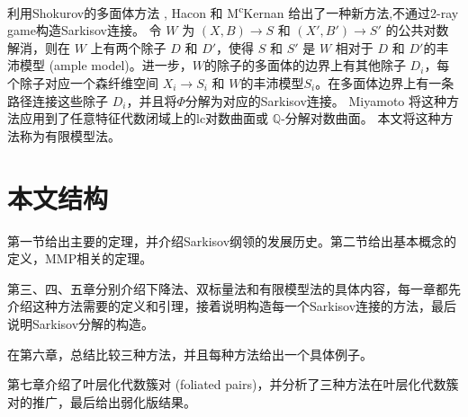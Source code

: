 利用Shokurov的多面体方法 \cite{Sho96,cs11}, Hacon 和 M\textsuperscript{c}Kernan \cite{haconSarkisovProgram2012}给出了一种新方法,不通过2-ray game构造Sarkisov连接。
令 $W$ 为 $(X,B)\to S$ 和 $(X',B')\to S'$ 的公共对数解消，则在 $W$ 上有两个除子 $D$ 和 $D'$，使得 $S$ 和 $S'$ 是 $W$ 相对于 $D$ 和 $D'$的丰沛模型 (ample model)。进一步，$W$的除子的多面体的边界上有其他除子 $D_{i}$，每个除子对应一个森纤维空间 $X_{i}\to S_{i}$ 和 $W$的丰沛模型$S_{i}$。在多面体边界上有一条路径连接这些除子 $D_{i}$，并且将$\Phi$分解为对应的Sarkisov连接。
Miyamoto \cite{miyamoto2019TheSP} 将这种方法应用到了任意特征代数闭域上的lc对数曲面或 $\mathbb{Q}$-分解对数曲面。 本文将这种方法称为有限模型法。

\section{本文结构}
第一节给出主要的定理，并介绍Sarkisov纲领的发展历史。第二节给出基本概念的定义，MMP相关的定理。

第三、四、五章分别介绍下降法、双标量法和有限模型法的具体内容，每一章都先介绍这种方法需要的定义和引理，接着说明构造每一个Sarkisov连接的方法，最后说明Sarkisov分解的构造。

在第六章，总结比较三种方法，并且每种方法给出一个具体例子。

第七章介绍了叶层化代数簇对 (foliated pairs)，并分析了三种方法在叶层化代数簇对的推广，最后给出弱化版结果。
